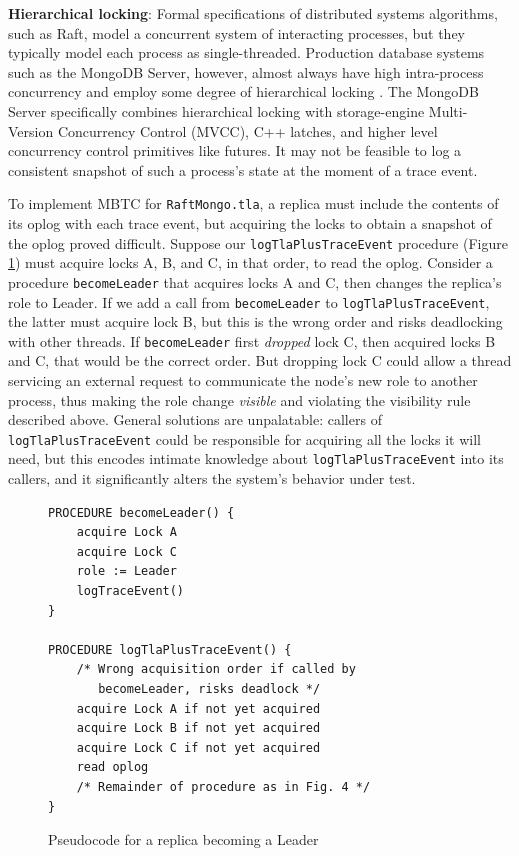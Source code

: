 \documentclass{vldb}
\begin{document}
\textbf{Hierarchical locking}: Formal specifications of distributed systems algorithms, such as Raft, model a concurrent system of interacting processes, but they typically model each process as single-threaded. 
Production database systems such as the MongoDB Server, however, almost always have high intra-process concurrency and employ some degree of hierarchical locking \cite{Gray76SharedLocks}. 
The MongoDB Server specifically combines hierarchical locking with storage-engine Multi-Version Concurrency Control (MVCC), C++ latches, and higher level concurrency control primitives like futures.
It may not be feasible to log a consistent snapshot of such a process's state at the moment of a trace event.


To implement MBTC for \texttt{RaftMongo.tla}, a replica must include the contents of its oplog with each trace event, but acquiring the locks to obtain a snapshot of the oplog proved difficult. 
Suppose our \texttt{logTlaPlusTraceEvent} procedure (Figure \ref{fig:logTlaPlusTraceEvent}) must acquire locks A, B, and C, in that order, to read the oplog.
Consider a procedure \texttt{becomeLeader} that acquires locks A and C, then changes the replica's role to Leader. 
If we add a call from \texttt{becomeLeader} to \texttt{logTlaPlusTraceEvent}, the latter must acquire lock B, but this is the wrong order and risks deadlocking with other threads.
If \texttt{becomeLeader} first \textit{dropped} lock C, then acquired locks B and C, that would be the correct order.
But dropping lock C could allow a thread servicing an external request to communicate the node's new role to another process, thus making the role change \textit{visible} and violating the visibility rule described above.
General solutions are unpalatable: callers of \texttt{logTlaPlusTraceEvent} could be responsible for acquiring all the locks it will need, but this encodes intimate knowledge about \texttt{logTlaPlusTraceEvent} into its callers, and it significantly alters the system's behavior under test.

\begin{figure}
\begin{verbatim}
PROCEDURE becomeLeader() {
    acquire Lock A
    acquire Lock C
    role := Leader
    logTraceEvent()
}

PROCEDURE logTlaPlusTraceEvent() {
    /* Wrong acquisition order if called by
       becomeLeader, risks deadlock */
    acquire Lock A if not yet acquired
    acquire Lock B if not yet acquired
    acquire Lock C if not yet acquired
    read oplog
    /* Remainder of procedure as in Fig. 4 */
}
\end{verbatim}
\caption{Pseudocode for a replica becoming a Leader}
\label{fig:logTlaPlusTraceEvent}
\end{figure}
\end{document}

